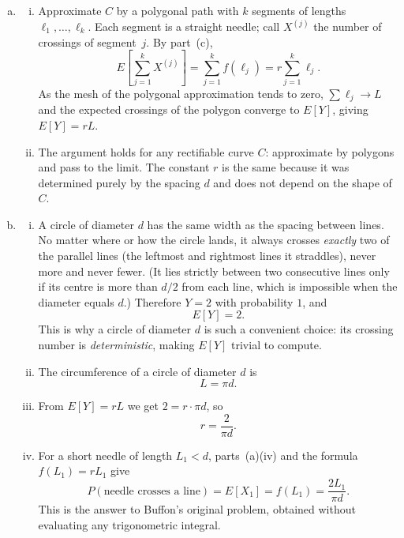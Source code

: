 \documentclass[12pt]{article}
\begin{document}
\begin{enumerate}[(a)]
\begin{enumerate}[(i)]
  \end{enumerate}

  \item

  \begin{enumerate}[(i)]

    \item Approximate $C$ by a polygonal path with $k$ segments of lengths
    $\ell_1, \ldots, \ell_k$.  Each segment is a straight needle; call
    $X^{(j)}$ the number of crossings of segment~$j$.  By part~(c),
    \[
      E\!\left[\sum_{j=1}^k X^{(j)}\right]
        = \sum_{j=1}^k f(\ell_j) = r\sum_{j=1}^k \ell_j.
    \]
    As the mesh of the polygonal approximation tends to zero, $\sum \ell_j
    \to L$ and the expected crossings of the polygon converge to $E[Y]$,
    giving $E[Y] = rL$.

    \item The argument holds for any rectifiable curve $C$: approximate by
    polygons and pass to the limit.  The constant $r$ is the same because
    it was determined purely by the spacing $d$ and does not depend on the
    shape of $C$.

  \end{enumerate}

  \item

  \begin{enumerate}[(i)]

    \item A circle of diameter $d$ has the same width as the spacing
    between lines.  No matter where or how the circle lands, it always
    crosses \emph{exactly} two of the parallel lines (the leftmost and
    rightmost lines it straddles), never more and never fewer.  (It lies
    strictly between two consecutive lines only if its centre is more than
    $d/2$ from each line, which is impossible when the diameter equals $d$.)
    Therefore $Y = 2$ with probability $1$, and
    \[
      E[Y] = 2.
    \]
    This is why a circle of diameter $d$ is such a convenient choice: its
    crossing number is \emph{deterministic}, making $E[Y]$ trivial to
    compute.

    \item The circumference of a circle of diameter $d$ is
    \[
      L = \pi d.
    \]

    \item From $E[Y] = rL$ we get $2 = r \cdot \pi d$, so
    \[
      r = \frac{2}{\pi d}.
    \]

    \item For a short needle of length $L_1 < d$, parts~(a)(iv) and the
    formula $f(L_1) = rL_1$ give
    \[
      P(\text{needle crosses a line})
        = E[X_1]
        = f(L_1)
        = \frac{2L_1}{\pi d}.
    \]
    This is the answer to Buffon's original problem, obtained without
    evaluating any trigonometric integral.

  \end{enumerate}

\end{enumerate}
\end{document}
